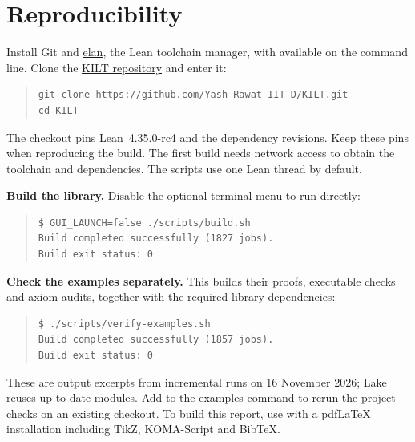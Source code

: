 \section{Reproducibility}\label{sec:appendix-reproducibility}

Install Git and \href{https://github.com/leanprover/elan}{elan}, the Lean
toolchain manager, with  available on the command line. Clone the
\href{https://github.com/Yash-Rawat-IIT-D/KILT}{KILT repository} and enter it:
\begin{quote}\small
\begin{verbatim}
git clone https://github.com/Yash-Rawat-IIT-D/KILT.git
cd KILT
\end{verbatim}
\end{quote}

The checkout pins Lean~4.35.0-rc4 and the dependency revisions. Keep these
pins when reproducing the build. The first build needs network access to
obtain the toolchain and dependencies. The scripts use one Lean thread by
default.

\textbf{Build the library.} Disable the optional terminal menu to run directly:
\begin{quote}\small
\begin{verbatim}
$ GUI_LAUNCH=false ./scripts/build.sh
Build completed successfully (1827 jobs).
Build exit status: 0
\end{verbatim}
\end{quote}

\textbf{Check the examples separately.} This builds their proofs, executable
checks and axiom audits, together with the required library dependencies:
\begin{quote}\small
\begin{verbatim}
$ ./scripts/verify-examples.sh
Build completed successfully (1857 jobs).
Build exit status: 0
\end{verbatim}
\end{quote}

These are output excerpts from incremental runs on 16 November 2026; Lake
reuses up-to-date modules. Add  to the examples command to
rerun the project checks on an existing checkout. To build this report, use
 with a pdfLaTeX installation including
TikZ, KOMA-Script and BibTeX.
